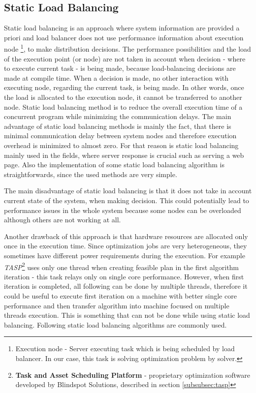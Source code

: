 \subsection{Static Load Balancing}\label{subsec:static-load-balancing}
Static load balancing is an approach where system information are provided a priori
and load balancer does not use performance information about execution node
\footnote{Execution node - Server executing task which is being scheduled by load balancer.
In our case, this task is solving optimization problem by solver.},
to make distribution decisions.
The performance possibilities and the load of the execution point (or node) are not taken in account
when decision - where to execute current task - is being made, because load-balancing decisions are made at compile time.
When a decision is made, no other interaction with executing node, regarding the current task, is being made.
In other words, once the load is allocated to the execution node, it cannot be transferred to another node.
Static load balancing method is to reduce the overall execution time of a concurrent program while minimizing the communication delays\cite{web:loadBalancingInGridComputing}.
The main advantage of static load balancing methods is mainly the fact, that there is minimal communication delay between system nodes
and therefore execution overhead is minimized to almost zero.
For that reason is static load balancing mainly used in the fields, where server response is crucial such as serving a web page.
Also the implementation of some static load balancing algorithm is straightforwards, since the used methods are very simple.

The main disadvantage of static load balancing is that it does not take in account current state of the system, when making decision.
This could potentially lead to performance issues in the whole system because some nodes can be overloaded although others are not working at all.

Another drawback of this approach is that hardware resources are allocated only once in the execution time.
Since optimization jobs are very heterogeneous, they sometimes have different power requirements during the execution.
For example \textit{TASP}\footnote{\textbf{Task and Asset Scheduling Platform} - proprietary optimization software developed by Blindspot Solutions,
described in section \ref{subsubsec:tasp}}
uses only one thread when creating feasible plan in the first algorithm iteration - this task relays only on single core performance.
However, when first iteration is completed, all following can be done by multiple threads,
therefore it could be useful to execute first iteration on a machine with better single core performance
and then transfer algorithm into machine focused on multiple threads execution.
This is something that can not be done while using static load balancing.\newline
Following static load balancing algorithms are commonly used.

